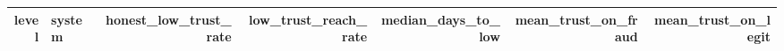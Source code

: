 \begin{tabular}{rlrrrrr}
\toprule
level & system & honest\_low\_trust\_rate & low\_trust\_reach\_rate & median\_days\_to\_low & mean\_trust\_on\_fraud & mean\_trust\_on\_legit \\
\midrule
\bottomrule
\end{tabular}
